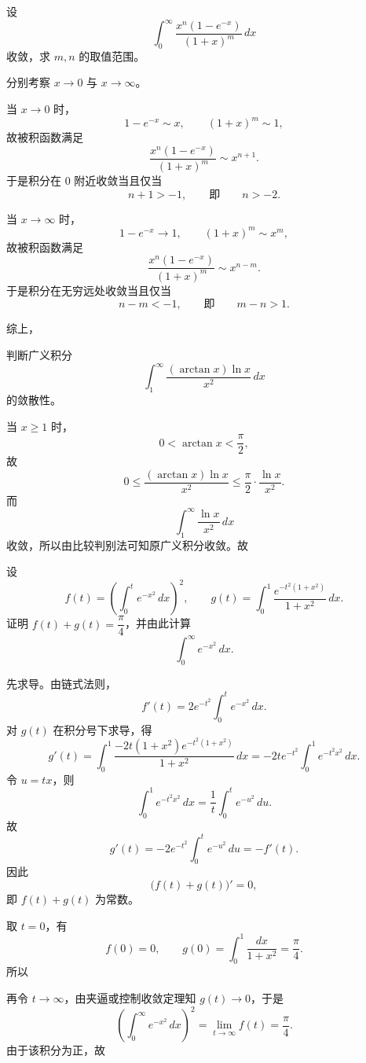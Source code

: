 \begin{question}[反常积分的收敛条件]

设
\[
\int_0^{\infty}\frac{x^n(1-e^{-x})}{(1+x)^m}\,dx
\]
收敛，求 $m,n$ 的取值范围。

\begin{solution}
分别考察 $x\to0$ 与 $x\to\infty$。

当 $x\to0$ 时，
\[
1-e^{-x}\sim x,
\qquad
(1+x)^m\sim 1,
\]
故被积函数满足
\[
\frac{x^n(1-e^{-x})}{(1+x)^m}\sim x^{n+1}.
\]
于是积分在 $0$ 附近收敛当且仅当
\[
n+1>-1,
\qquad\text{即}\qquad n>-2.
\]

当 $x\to\infty$ 时，
\[
1-e^{-x}\to1,
\qquad
(1+x)^m\sim x^m,
\]
故被积函数满足
\[
\frac{x^n(1-e^{-x})}{(1+x)^m}\sim x^{n-m}.
\]
于是积分在无穷远处收敛当且仅当
\[
n-m<-1,
\qquad\text{即}\qquad m-n>1.
\]

综上，
\end{solution}
\end{question}

\begin{question}[广义积分的敛散性]

判断广义积分
\[
\int_1^{\infty}\frac{(\arctan x)\ln x}{x^2}\,dx
\]
的敛散性。

\begin{solution}
当 $x\ge1$ 时，
\[
0<\arctan x<\frac{\pi}{2},
\]
故
\[
0\le \frac{(\arctan x)\ln x}{x^2}
\le \frac{\pi}{2}\cdot \frac{\ln x}{x^2}.
\]
而
\[
\int_1^{\infty}\frac{\ln x}{x^2}\,dx
\]
收敛，所以由比较判别法可知原广义积分收敛。故
\end{solution}
\end{question}

\begin{question}[恒等式证明与高斯积分]

设
\[
f(t)=\left(\int_0^t e^{-x^2}\,dx\right)^2,
\qquad
g(t)=\int_0^1\frac{e^{-t^2(1+x^2)}}{1+x^2}\,dx.
\]
证明 $f(t)+g(t)=\dfrac{\pi}{4}$，并由此计算
\[
\int_0^{\infty}e^{-x^2}\,dx.
\]

\begin{solution}
先求导。由链式法则，
\[
f'(t)=2e^{-t^2}\int_0^t e^{-x^2}\,dx.
\]
对 $g(t)$ 在积分号下求导，得
\[
g'(t)=\int_0^1\frac{-2t(1+x^2)e^{-t^2(1+x^2)}}{1+x^2}\,dx
=-2t e^{-t^2}\int_0^1 e^{-t^2x^2}\,dx.
\]
令 $u=tx$，则
\[
\int_0^1 e^{-t^2x^2}\,dx=\frac1t\int_0^t e^{-u^2}\,du.
\]
故
\[
g'(t)=-2e^{-t^2}\int_0^t e^{-u^2}\,du=-f'(t).
\]
因此
\[
\bigl(f(t)+g(t)\bigr)'=0,
\]
即 $f(t)+g(t)$ 为常数。

取 $t=0$，有
\[
f(0)=0,
\qquad
g(0)=\int_0^1\frac{dx}{1+x^2}=\frac{\pi}{4}.
\]
所以

再令 $t\to\infty$，由夹逼或控制收敛定理知 $g(t)\to0$，于是
\[
\left(\int_0^{\infty}e^{-x^2}\,dx\right)^2=\lim_{t\to\infty}f(t)=\frac{\pi}{4}.
\]
由于该积分为正，故
\end{solution}
\end{question}

